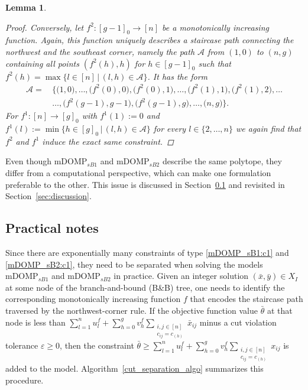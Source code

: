 \documentclass[letterpaper]{article}
\newtheorem{lemma}[theorem]{Lemma}
\begin{document}
\begin{lemma}
\begin{proof}
        Conversely, let $f^2: [g-1]_0 \rightarrow [n]$ be a monotonically increasing function. Again, this function uniquely describes a staircase path connecting the northwest and the southeast corner, namely the path $\mathcal{A}$ from $(1, 0)$ to $(n, g)$ containing all points $(f^2(h), h)$ for $h \in [g-1]_0$ such that $f^2(h) = \max\{l \in [n] \, | \, (l,h) \in \mathcal{A} \}$. It has the form
        \begin{align*}
            \mathcal{A} = \, &\big\{\big(1,0\big), \dots, \big(f^2(0), 0\big), \big(f^2(0), 1\big), \dots, \big(f^2(1), 1\big), \big(f^2(1), 2\big), \dots \\
            &\dots, \big(f^2(g-1), g-1\big), \big(f^2(g-1), g\big), \dots, \big(n, g\big)\big\}.
        \end{align*}
        For $f^1:[n] \rightarrow [g]_0$ with $f^1(1) := 0$ and $f^1(l) := \min \{h \in [g]_0 \, | \, (l,h) \in \mathcal{A}\}$ for every $l \in \{2, \dots, n\}$ we again find that $f^2$ and $f^1$ induce the exact same constraint.
    \end{proof}
\end{lemma}

Even though $\text{mDOMP}_{sB1}$ and $\text{mDOMP}_{sB2}$ describe the same polytope, they differ from a computational perspective, which can make one formulation preferable to the other. This issue is discussed in Section~\ref{sec:practical_notes} and revisited in Section~\ref{sec:discussion}.

\subsection{Practical notes}\label{sec:practical_notes}
Since there are exponentially many constraints of type \eqref{mDOMP_sB1:c1} and \eqref{mDOMP_sB2:c1}, they need to be separated when solving the models $\text{mDOMP}_{sB1}$ and $\text{mDOMP}_{sB2}$ in practice. Given an integer solution $(\bar{x}, \bar{y}) \in X_I$ at some node of the branch-and-bound (B\&B) tree, one needs to identify the corresponding monotonically increasing function $f$ that encodes the staircase path traversed by the northwest-corner rule. If the objective function value $\bar{\theta}$ at that node is less than $\sum_{l = 1}^n u^f_l + \allowbreak \sum_{h = 0}^g v^f_h  \allowbreak \sum_{\substack{i,j \in [n] \\ c_{ij} = c_{(h)}}} \bar{x}_{ij}$ minus a cut violation tolerance $\varepsilon \geq 0$, then the constraint ${\bar{\theta}\ge } \sum_{l = 1}^n u^f_l + \allowbreak \sum_{h = 0}^g v^f_h  \allowbreak \sum_{\substack{i,j \in [n] \\ c_{ij} = c_{(h)}}} x_{ij}$ is added to the model. Algorithm~\ref{cut_separation_algo} summarizes this procedure.
\end{document}

